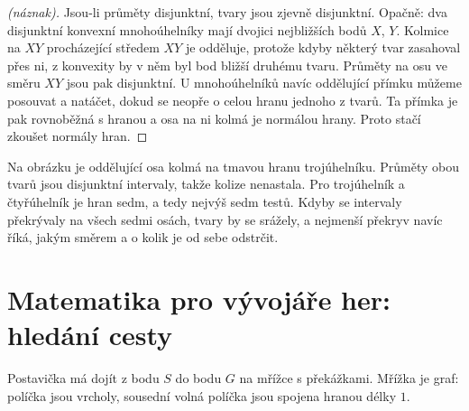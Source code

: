\begin{center}
\end{center}

\begin{proof}[(náznak)]
  Jsou-li průměty disjunktní, tvary jsou zjevně disjunktní. Opačně: dva disjunktní konvexní mnohoúhelníky mají dvojici nejbližších bodů $X$, $Y$. Kolmice na $XY$ procházející středem $XY$ je odděluje, protože kdyby některý tvar zasahoval přes ni, z konvexity by v něm byl bod bližší druhému tvaru. Průměty na osu ve směru $XY$ jsou pak disjunktní. U mnohoúhelníků navíc oddělující přímku můžeme posouvat a natáčet, dokud se neopře o celou hranu jednoho z tvarů. Ta přímka je pak rovnoběžná s hranou a osa na ni kolmá je normálou hrany. Proto stačí zkoušet normály hran.
\end{proof}

Na obrázku je oddělující osa kolmá na tmavou hranu trojúhelníku. Průměty obou tvarů jsou disjunktní intervaly, takže kolize nenastala. Pro trojúhelník a čtyřúhelník je hran sedm, a tedy nejvýš sedm testů. Kdyby se intervaly překrývaly na všech sedmi osách, tvary by se srážely, a nejmenší překryv navíc říká, jakým směrem a o kolik je od sebe odstrčit.

\section{Matematika pro vývojáře her: hledání cesty}

Postavička má dojít z bodu $S$ do bodu $G$ na mřížce s překážkami. Mřížka je graf: políčka jsou vrcholy, sousední volná políčka jsou spojena hranou délky $1$.

